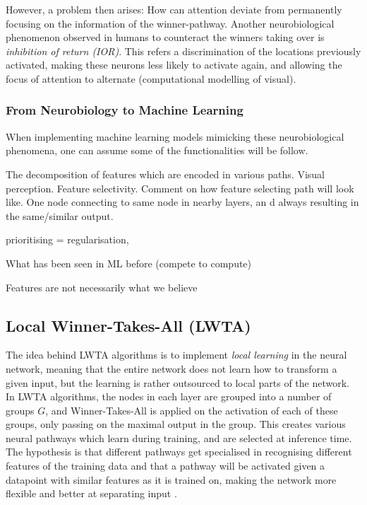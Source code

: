         However, a problem then arises: How can attention deviate from permanently focusing on the information of the  winner-pathway. Another neurobiological phenomenon observed in humans to counteract the winners taking over is \textit{inhibition of return (IOR)}. This refers a discrimination of the locations previously activated, making these neurons less likely to activate again, and allowing the focus of attention to alternate (computational modelling of visual).  

    \subsubsection{From Neurobiology to Machine Learning}
        When implementing machine learning models mimicking these neurobiological phenomena, one can assume some of the functionalities will be follow. 
        
        The decomposition of features which are encoded in various paths. Visual perception. Feature selectivity. Comment on how feature selecting path will look like. One node connecting to same node in nearby layers, an d always resulting in the same/similar output. 

        prioritising = regularisation,

        What has been seen in ML before (compete to compute)

        Features are not necessarily what we believe 

\subsection{Local Winner-Takes-All (LWTA)}
    The idea behind LWTA algorithms is to implement \textit{local learning} in the neural network, meaning that the entire network does not learn how to transform a given input, but the learning is rather outsourced to local parts of the network. In LWTA algorithms, the nodes in each layer are grouped into a number of groups $G$, and Winner-Takes-All is applied on the activation of each of these groups, only passing on the maximal output in the group. This creates various neural pathways which learn during training, and are selected at inference time. The hypothesis is that different pathways get specialised in recognising different features of the training data and that a pathway will be activated given a datapoint with similar features as it is trained on, making the network more flexible and better at separating input \citep{Wang}. 

